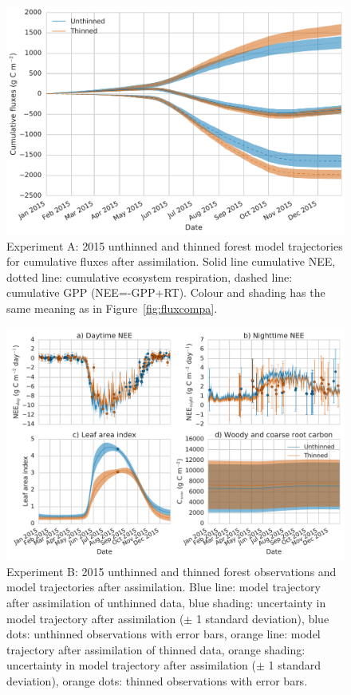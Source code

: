 \documentclass[draft,jgrga]{agutexSI}
\begin{document}
 \begin{figure}
 \noindent\includegraphics[width=40pc]{cum_fluxa.pdf}
\caption{Experiment A: 2015 unthinned and thinned forest model trajectories for cumulative fluxes after assimilation. Solid line cumulative NEE, dotted line: cumulative ecosystem respiration, dashed line: cumulative GPP (NEE=-GPP+RT). Colour and shading has the same meaning as in Figure~\ref{fig:fluxcompa}.}
 \label{fig:fluxcuma}
 \end{figure}


 \begin{figure}
 \noindent\includegraphics[width=40pc]{obs_compb.pdf}
\caption{Experiment B: 2015 unthinned and thinned forest observations and model trajectories after assimilation. Blue line: model trajectory after assimilation of unthinned data, blue shading: uncertainty in model trajectory after assimilation (\(\pm\) 1 standard deviation), blue dots: unthinned observations with error bars, orange line: model trajectory after assimilation of thinned data, orange shading: uncertainty in model trajectory after assimilation (\(\pm\) 1 standard deviation), orange dots: thinned observations with error bars.}
 \label{fig:obscompb}
 \end{figure}
 
\end{document}
